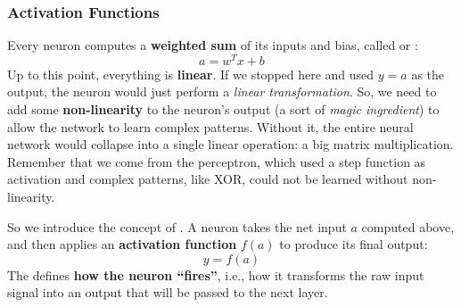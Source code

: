 \subsubsection{Activation Functions}\label{sec:activation-functions}

Every neuron computes a \textbf{weighted sum} of its inputs and bias, called  or :
\begin{equation}\label{eq:net-input}
    a = w^{T} x + b
\end{equation}
Up to this point, everything is \textbf{linear}. If we stopped here and used $y = a$ as the output, the neuron would just perform a \emph{linear transformation}. So, we need to add some \textbf{non-linearity} to the neuron's output (a sort of \emph{magic ingredient}) to allow the network to learn complex patterns. Without it, the entire neural network would collapse into a single linear operation: a big matrix multiplication. Remember that we come from the perceptron, which used a step function as activation and complex patterns, like XOR, could not be learned without non-linearity.

\highspace
So we introduce the concept of . A neuron takes the net input $a$ computed above, and then applies an \textbf{activation function} $f(a)$ to produce its final output:
\begin{equation*}
    y = f(a)
\end{equation*}
The  defines \textbf{how the neuron ``fires''}, i.e., how it transforms the raw input signal into an output that will be passed to the next layer.

